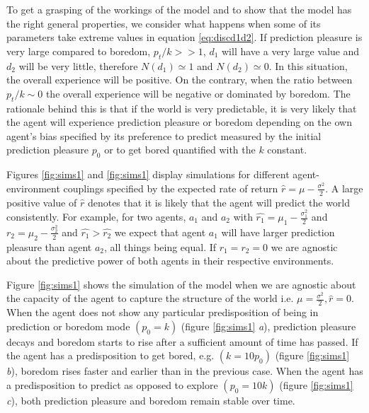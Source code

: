 \documentclass[11pt, onecolumn]{article}
\begin{document}
To get a grasping of the workings of the model and to show that the model has the right general properties, we consider what happens when some of its parameters take extreme values in equation \ref{eq:discd1d2}. If prediction pleasure is very large compared to boredom, $p_t/k >> 1$, $d_1$ will have a very large value and $d_2$ will be very little, therefore $N(d_1) \simeq 1$ and $N(d_2) \simeq 0$. In this situation, the overall experience will be positive. On the contrary, when the ratio between $p_t/k \sim 0$ the overall experience will be negative or dominated by boredom. 
The rationale behind this is that if the world is very predictable, it is very likely that the agent will experience prediction pleasure or boredom depending on the own agent's bias specified by its preference to predict measured by the initial prediction pleasure $p_0$ or to get bored quantified with the $k$ constant.

Figures \ref{fig:sims1} and \ref{fig:sims1} display simulations for different agent-environment couplings specified by the expected rate of return $\hat{r} = \mu - \frac{\sigma ^2}{2} $. A large positive value of $\hat{r}$ denotes that it is likely that the agent will predict the world consistently. 
For example, for two agents, $a_1$ and $a_2$ with $\hat{r_1} = \mu_1 - \frac{\sigma_1 ^2}{2}$ and $\hat{r_2} = \mu_2 - \frac{\sigma_2 ^2}{2}$ and $\hat{r_1} > \hat{r_2}$ we expect that agent $a_1$ will have larger prediction pleasure than agent $a_2$, all things being equal. If $r_1 =r_2 = 0$ we are agnostic about the predictive power of both agents in their respective environments. 

Figure \ref{fig:sims1} shows the simulation of the model when we are agnostic about the capacity  of the agent to capture the structure of the world i.e. $\mu  = \frac{\sigma ^2}{2}, \hat{r} =0$. When the agent does not show any particular predisposition of being in prediction or boredom mode $(p_0 = k)$ (figure \ref{fig:sims1} \emph{a}), prediction pleasure decays and boredom starts to rise after a sufficient amount of time has passed. If the agent has a predisposition to  get bored, e.g. $(k = 10p_0)$ (figure \ref{fig:sims1} \emph{b}), boredom rises faster and earlier than in the previous case. When the agent has a predisposition to predict as opposed to explore $( p_0 = 10k )$ (figure \ref{fig:sims1} \emph{c}), both prediction pleasure and boredom remain stable over time.
\end{document}
